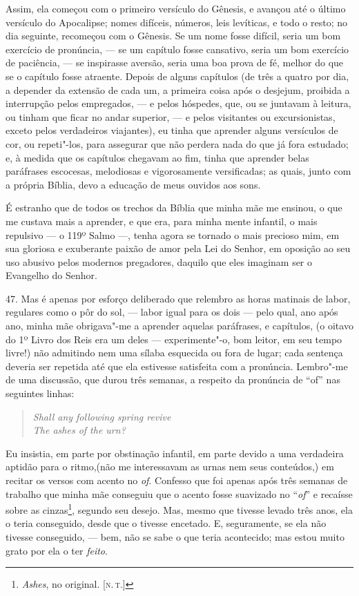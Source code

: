 Assim, ela começou com o primeiro versículo do Gênesis, e avançou até o
último versículo do Apocalipse; nomes difíceis, números, leis levíticas,
e todo o resto; no dia seguinte, recomeçou com o Gênesis. Se um nome
fosse difícil, seria um bom exercício de pronúncia, --- se um capítulo
fosse cansativo, seria um bom exercício de paciência, --- se inspirasse
aversão, seria uma boa prova de fé, melhor do que se o capítulo fosse
atraente. Depois de alguns capítulos (de três a quatro por dia, a
depender da extensão de cada um, a primeira coisa após o desjejum,
proibida a interrupção pelos empregados, --- e pelos hóspedes, que, ou se
juntavam à leitura, ou tinham que ficar no andar superior, --- e pelos
visitantes ou excursionistas, exceto pelos verdadeiros viajantes), eu
tinha que aprender alguns versículos de cor, ou repeti"-los, para
assegurar que não perdera nada do que já fora estudado; e, à medida que
os capítulos chegavam ao fim, tinha que aprender belas paráfrases
escocesas, melodiosas e vigorosamente versificadas; as quais, junto com
a própria Bíblia, devo a educação de meus ouvidos aos sons.

É estranho que de todos os trechos da Bíblia que minha mãe me ensinou, o
que me custava mais a aprender, e que era, para minha mente infantil, o
mais repulsivo --- o 119º Salmo ---, tenha agora se tornado o mais
precioso mim, em sua gloriosa e exuberante paixão de amor pela Lei do
Senhor, em oposição ao seu uso abusivo pelos modernos pregadores,
daquilo que eles imaginam ser o Evangelho do Senhor.

47. Mas é apenas por esforço deliberado que relembro as horas matinais
de labor, regulares como o pôr do sol, --- labor igual para os dois ---
pelo qual, ano após ano, minha mãe obrigava"-me a aprender aquelas
paráfrases, e capítulos, (o oitavo do 1º Livro dos Reis era um deles ---
experimente"-o, bom leitor, em seu tempo livre!) não admitindo nem uma
sílaba esquecida ou fora de lugar; cada sentença deveria ser repetida
até que ela estivesse satisfeita com a pronúncia. Lembro"-me de uma
discussão, que durou três semanas, a respeito da pronúncia de ``of'' nas
seguintes linhas:

\begin{verse}
\emph{Shall any following spring revive}\\
\emph{The ashes of the urn?}\footnotemark
\end{verse}

\noindent{}Eu insistia, em parte por obstinação infantil, em parte devido a uma
verdadeira aptidão para o ritmo,(não me interessavam as urnas nem seus
conteúdos,) em recitar os versos com acento no \emph{of}. Confesso que
foi apenas após três semanas de trabalho que minha mãe conseguiu que o
acento fosse suavizado no ``\emph{of}'' e recaísse sobre as
cinzas\footnote{\emph{Ashes}, no original. {[}\textsc{n.\,t.}{]}}, segundo seu
desejo. Mas, mesmo que tivesse levado três anos, ela o teria conseguido,
desde que o tivesse encetado. E, seguramente, se ela não tivesse
conseguido, --- bem, não se sabe o que teria acontecido; mas estou muito
grato por ela o ter \emph{feito}.


